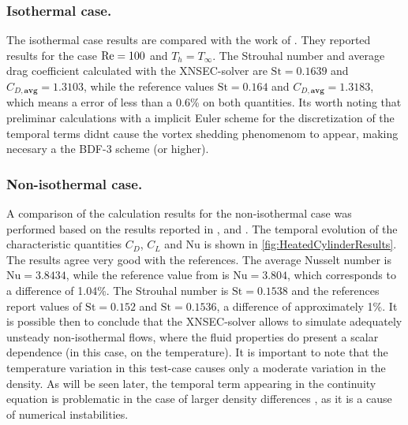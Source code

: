\subsubsection{Isothermal case.}
The isothermal case results are compared with the work of \cite{sharmaHEATFLUIDFLOW2004}. They reported results for the case $\text{Re} = 100$ and $T_h = T_\infty$. The Strouhal number and average drag coefficient calculated with the XNSEC-solver are $\text{St} = 0.1639$ and $C_{D,\textbf{avg}} = 1.3103$, while the reference values $\text{St} = 0.164$ and $C_{D,\textbf{avg}} = 1.3183$, which means a error of less than a 0.6\% on both quantities. Its worth noting that preliminar calculations with a implicit Euler scheme for the discretization of the temporal terms didnt cause the vortex shedding phenomenom to appear, making necesary a the BDF-3 scheme (or higher).
\subsubsection{Non-isothermal case.}
A comparison of the calculation results for the non-isothermal case was performed based on the results reported in \cite{shiHeatingEffectSteady2004}, \cite{wangRelationshipEffectiveReynolds2000} and \cite{henninkLowMachNumberFlow2022}.
The temporal evolution of the characteristic quantities $C_D$, $C_L$ and Nu is shown in \cref{fig:HeatedCylinderResults}. The results agree very good with the references. The average Nusselt number is  $\text{Nu} = 3.8434$, while the reference value from \cite{henninkLowMachNumberFlow2022} is $\text{Nu} = 3.804$, which corresponds to a difference of 1.04\%. The Strouhal number is $\text{St} = 0.1538$ and the references report values of $\text{St} = 0.152$ and $\text{St} = 0.1536$, a difference of approximately 1\%. It is possible then to conclude that the XNSEC-solver allows to simulate adequately unsteady non-isothermal flows, where the fluid properties do present a scalar dependence (in this case, on the temperature). It is important to note that the temperature variation in this test-case causes only a moderate variation in the density. As will be seen later, the temporal term appearing in the continuity equation is problematic in the case of larger density differences \citep{knikkerComparativeStudyHighorder2011}, as it is a cause of numerical instabilities.




\FloatBarrier